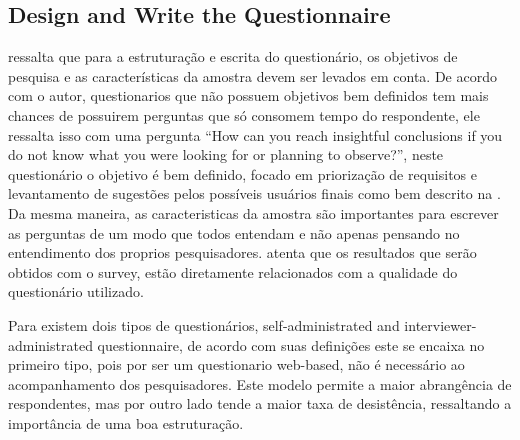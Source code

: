 \subsection{Design and Write the Questionnaire} \label{sec:survey-questionnaire}



 ressalta que para a estruturação e escrita do questionário, os objetivos de pesquisa e as características da amostra devem ser levados em conta. 
De acordo com o autor, questionarios que não possuem objetivos bem definidos tem mais chances de possuirem perguntas que só consomem tempo do respondente, ele ressalta isso com uma pergunta  ``How can you reach insightful conclusions if you do not know what you were looking for or planning to observe?'', neste questionário o objetivo é bem definido, focado em priorização de requisitos e levantamento de sugestões pelos possíveis usuários finais como bem descrito na . 
Da mesma maneira, as caracteristicas da amostra são importantes para escrever as perguntas de um modo que todos entendam e não apenas pensando no entendimento dos proprios pesquisadores. 
 atenta que os resultados que serão obtidos com o survey, estão diretamente relacionados com a qualidade do questionário utilizado.

Para  existem dois tipos de questionários, self-administrated and interviewer-administrated questionnaire, de acordo com suas definições este se encaixa no primeiro tipo, pois por ser um questionario web-based, não é necessário ao acompanhamento dos pesquisadores. 
Este modelo permite a maior abrangência de respondentes, mas por outro lado tende a maior taxa de desistência, ressaltando a importância de uma boa estruturação.

